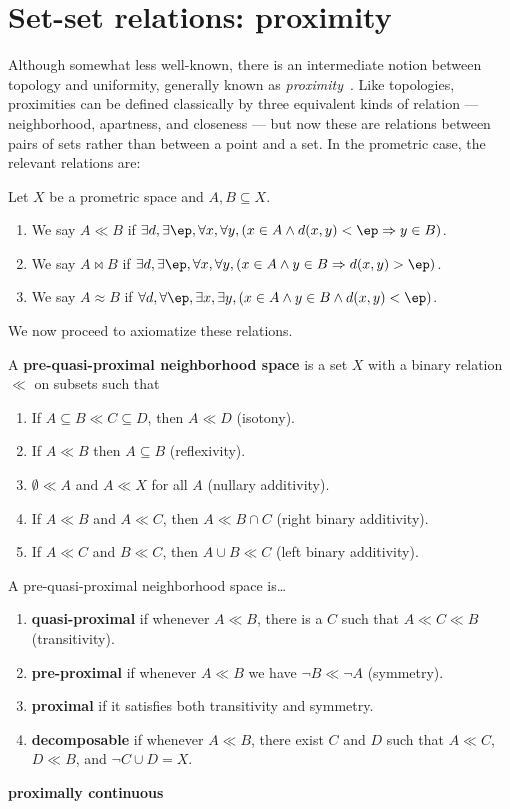 \documentclass{article}
\def\cpl#1{\neg #1}
\let\implies\Rightarrow
\begin{document}
\section{Set-set relations: proximity}
\label{sec:set-set}
\label{sec:proximity}

Although somewhat less well-known, there is an intermediate notion between topology and uniformity, generally known as \emph{proximity}~\cite{proximity-spaces}.
Like topologies, proximities can be defined classically by three equivalent kinds of relation --- neighborhood, apartness, and closeness --- but now these are relations between pairs of sets rather than between a point and a set.
In the prometric case, the relevant relations are:

\begin{defn}
  Let $X$ be a prometric space and $A,B\subseteq X$.
  \begin{enumerate}
  \item We say $A\ll B$ if $\exists d, \exists \ep, \forall x, \forall y, (x\in A \land d(x,y)<\ep \implies y\in B)$.
  \item We say $A\bowtie B$ if $\exists d, \exists \ep, \forall x, \forall y, (x\in A \land y\in B \implies d(x,y)>\ep)$.
  \item We say $A\approx B$ if $\forall d, \forall \ep, \exists x, \exists y, (x\in A \land y\in B \land d(x,y)<\ep)$.
  \end{enumerate}
\end{defn}

We now proceed to axiomatize these relations.

\begin{defn}
  A \textbf{pre-quasi-proximal neighborhood space} is a set $X$ with a binary relation $\ll$ on subsets such that
  \begin{enumerate}
  \item If $A \subseteq B \ll C \subseteq D$, then $A\ll D$ (isotony).
  \item If $A\ll B$ then $A\subseteq B$ (reflexivity).
  \item $\emptyset \ll A$ and $A\ll X$ for all $A$ (nullary additivity).
  \item If $A\ll B$ and $A\ll C$, then $A\ll B\cap C$ (right binary additivity).
  \item If $A\ll C$ and $B\ll C$, then $A\cup B \ll C$ (left binary additivity).
  \end{enumerate}
  A pre-quasi-proximal neighborhood space is\dots
  \begin{enumerate}[resume]
  \item \textbf{quasi-proximal} if whenever $A\ll B$, there is a $C$ such that $A\ll C \ll B$ (transitivity).
  \item \textbf{pre-proximal} if whenever $A\ll B$ we have $\cpl{B} \ll \cpl{A}$ (symmetry).
  \item \textbf{proximal} if it satisfies both transitivity and symmetry.
  \item \textbf{decomposable} if whenever $A\ll B$, there exist $C$ and $D$ such that $A\ll C$, $D\ll B$, and $\cpl{C}\cup D = X$.
  \end{enumerate}
  \textbf{proximally continuous}
\end{defn}
\end{document}
